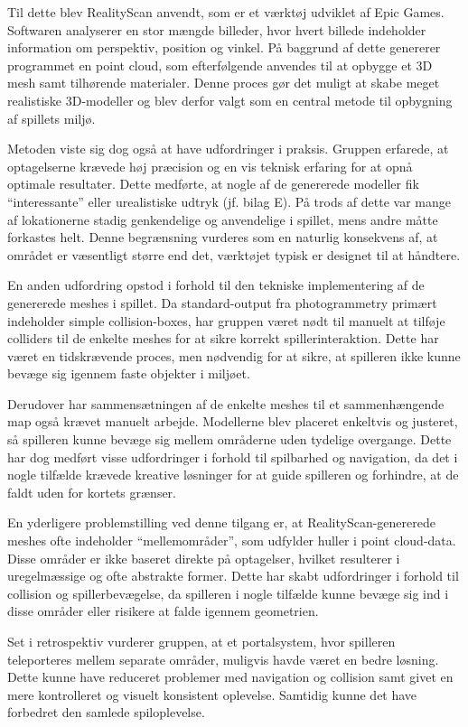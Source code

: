 Til dette blev RealityScan anvendt, som er et værktøj udviklet af Epic Games. Softwaren analyserer en stor mængde billeder, hvor hvert billede indeholder information om perspektiv, position og vinkel. På baggrund af dette genererer programmet en point cloud, som efterfølgende anvendes til at opbygge et 3D mesh samt tilhørende materialer. Denne proces gør det muligt at skabe meget realistiske 3D-modeller og blev derfor valgt som en central metode til opbygning af spillets miljø.

Metoden viste sig dog også at have udfordringer i praksis. Gruppen erfarede, at optagelserne krævede høj præcision og en vis teknisk erfaring for at opnå optimale resultater. Dette medførte, at nogle af de genererede modeller fik “interessante” eller urealistiske udtryk (jf. bilag E). På trods af dette var mange af lokationerne stadig genkendelige og anvendelige i spillet, mens andre måtte forkastes helt. Denne begrænsning vurderes som en naturlig konsekvens af, at området er væsentligt større end det, værktøjet typisk er designet til at håndtere.

En anden udfordring opstod i forhold til den tekniske implementering af de genererede meshes i spillet. Da standard-output fra photogrammetry primært indeholder simple collision-boxes, har gruppen været nødt til manuelt at tilføje colliders til de enkelte meshes for at sikre korrekt spillerinteraktion. Dette har været en tidskrævende proces, men nødvendig for at sikre, at spilleren ikke kunne bevæge sig igennem faste objekter i miljøet.

Derudover har sammensætningen af de enkelte meshes til et sammenhængende map også krævet manuelt arbejde. Modellerne blev placeret enkeltvis og justeret, så spilleren kunne bevæge sig mellem områderne uden tydelige overgange. Dette har dog medført visse udfordringer i forhold til spilbarhed og navigation, da det i nogle tilfælde krævede kreative løsninger for at guide spilleren og forhindre, at de faldt uden for kortets grænser.

En yderligere problemstilling ved denne tilgang er, at RealityScan-genererede meshes ofte indeholder “mellemområder”, som udfylder huller i point cloud-data. Disse områder er ikke baseret direkte på optagelser, hvilket resulterer i uregelmæssige og ofte abstrakte former. Dette har skabt udfordringer i forhold til collision og spillerbevægelse, da spilleren i nogle tilfælde kunne bevæge sig ind i disse områder eller risikere at falde igennem geometrien.

Set i retrospektiv vurderer gruppen, at et portalsystem, hvor spilleren teleporteres mellem separate områder, muligvis havde været en bedre løsning. Dette kunne have reduceret problemer med navigation og collision samt givet en mere kontrolleret og visuelt konsistent oplevelse. Samtidig kunne det have forbedret den samlede spiloplevelse.

